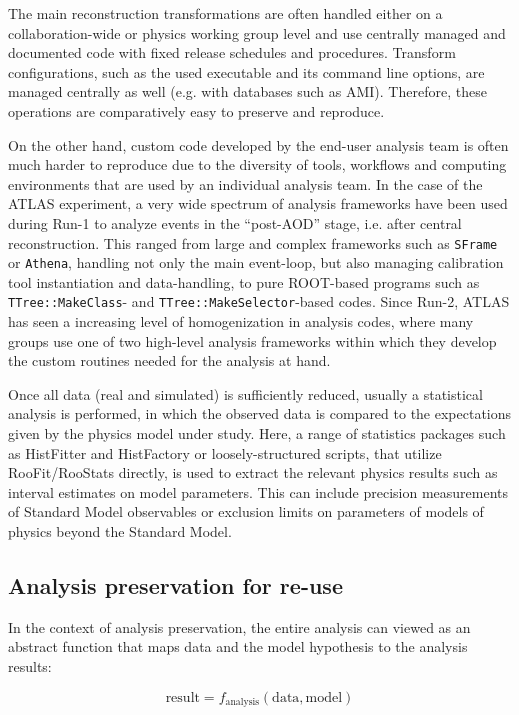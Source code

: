 \documentclass[a4paper]{jpconf}
\begin{document}
The main reconstruction transformations are often handled either on a collaboration-wide or physics working group level and use centrally managed and documented code with fixed release schedules and procedures. Transform configurations, such as the used executable and its command line options, are managed centrally as well (e.g. with databases such as AMI\cite{AMI2010}). Therefore, these operations are comparatively easy to preserve and reproduce.

On the other hand, custom code developed by the end-user analysis team is often much harder to reproduce due to the diversity of tools, workflows and computing environments that are used by an individual analysis team. In the case of the ATLAS experiment, a very wide spectrum of analysis frameworks have been used during Run-1 to analyze events in the ``post-AOD'' stage, i.e. after central reconstruction. This ranged from large and complex frameworks such as \texttt{SFrame} or \texttt{Athena}, handling not only the main event-loop, but also managing calibration tool instantiation and data-handling, to pure ROOT-based programs such as \texttt{TTree::MakeClass}- and \texttt{TTree::MakeSelector}-based codes. Since Run-2, ATLAS has seen a increasing level of homogenization in analysis codes, where many groups use one of two high-level analysis frameworks within which they develop the custom routines needed for the analysis at hand.

Once all data (real and simulated) is sufficiently reduced, usually a statistical analysis is performed, in which the observed data is compared to the expectations given by the physics model under study. Here, a range of statistics packages such as HistFitter and HistFactory or loosely-structured scripts, that utilize RooFit/RooStats directly, is used to extract the relevant physics results such as interval estimates on model parameters. This can include precision measurements of Standard Model observables or exclusion limits on parameters of models of physics beyond the Standard Model.

\subsection{Analysis preservation for re-use}
In the context of analysis preservation, the entire analysis can viewed as an abstract function that maps data and the model hypothesis to the analysis results:

\begin{equation}
	\textrm{result} = f_{\textrm{analysis}}(\textrm{data}, \textrm{model})
\end{equation}
\end{document}
